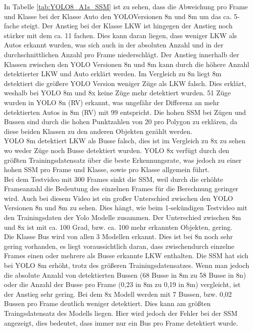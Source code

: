 {		In Tabelle \ref{tab:YOLO8_A1s_SSM} ist zu sehen, dass die Abweichung pro Frame und Klasse bei der Klasse Auto den YOLOVersionen 8n und 8m um das ca. 5-fache steigt. Der Anstieg bei der Klasse LKW ist hingegen der Anstieg noch stärker mit dem ca. 11 fachen. Dies kann daran liegen, dass weniger LKW als Autos erkannt wurden, was sich auch in der absoluten Anzahl und in der durchschnittlichen Anzahl pro Frame niederschlägt. Der Anstieg innerhalb der Klassen zwischen den YOLO Versionen 8n und 8m kann durch die höhere Anzahl detektierter LKW und Auto erklärt werden.
		Im Vergleich zu  8n liegt 8m detektiert die größere YOLO Version weniger Züge als LKW falsch. Dies erklärt, weshalb bei YOLO 8m und 8x keine Züge mehr detektiert wurden. 51 Züge wurden in YOLO 8n (RV) erkannt, was ungefähr der Differenz an mehr detektierten Autos in 8m (RV) mit 99 entspricht. Die hohen SSM bei Zügen und Bussen sind durch die hohen Punktzahlen von 20 pro Polygon zu erklären, da diese beiden Klassen zu den \glqq  anderen Objekten\grqq{} gezählt werden. \\
		YOLO 8m detektiert LKW als Busse falsch, dies ist im Vergleich zu 8x zu sehen wo weder Züge noch Busse detektiert wurden. YOLO 8x verfügt durch den größten Trainingsdatensatz über die beste Erkennungsrate, was jedoch zu einer hohen SSM pro Frame und Klasse, sowie pro Klasse allgemein führt. \\
		Bei dem Testvideo mit 300 Frames sinkt die SSM, weil durch die erhöhte Frameanzahl die Bedeutung des einzelnen Frames für die Berechnung geringer wird. Auch bei diesem Video ist ein großer Unterschied zwischen den YOLO Versionen 8n und 8m zu sehen. Dies hängt, wie beim 1-sekündigen Testvideo mit den Trainingsdaten der Yolo Modelle zusammen. Der Unterschied zwischen 8m und 8x ist mit ca. 100 Grad, bzw. ca. 100 mehr erkannten Objekten, gering. \\
		Die Klasse Bus wird von allen 3 Modellen erkannt. Dies ist bei 8n noch sehr gering vorhanden, es liegt voraussichtlich daran, dass zwischendurch einzelne Frames einen oder mehrere als Busse erkannte LKW enthalten. Die SSM hat sich bei YOLO 8m erhöht, trotz des größeren Trainingsdatensatzes. Wenn man jedoch die absolute Anzahl von detektierten Bussen (68 Busse in 8m zu 58 Busse in 8n) oder die Anzahl der Busse pro Frame (0,23 in 8m zu 0,19 in 8m) vergleicht, ist der Anstieg sehr gering. Bei dem 8x Modell werden mit 7 Bussen, bzw. 0,02 Bussen pro Frame deutlich weniger detektiert. Dies kann am größten Traingsdatensatz des Modells liegen. Hier wird jedoch der Fehler bei der SSM angezeigt, dies bedeutet, dass immer nur ein Bus pro Frame detektiert wurde. 
}
